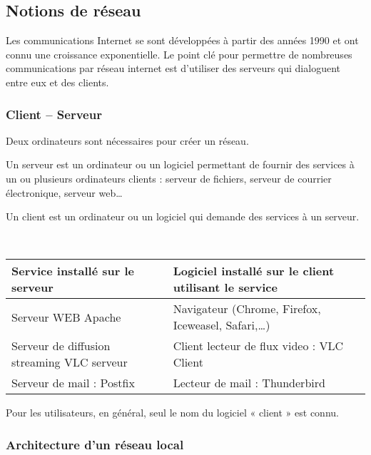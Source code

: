 \subsection{Notions de réseau}
Les communications Internet se sont développées à partir des années 1990 et ont connu une croissance exponentielle. Le point clé pour permettre de nombreuses communications par réseau internet est d’utiliser des serveurs qui dialoguent entre eux et des clients.
\subsubsection{Client -- Serveur}
Deux ordinateurs sont nécessaires pour créer un réseau.
\begin{defi}[Serveur]
Un serveur est un ordinateur ou un logiciel permettant de fournir des services à un ou plusieurs ordinateurs clients : serveur de fichiers, serveur de courrier électronique, serveur web…
\end{defi}

\begin{defi}[Client]
Un client est un ordinateur ou un logiciel qui demande des services à un serveur. 
\end{defi}

\begin{exemple}~\\


\begin{center}
\begin{tabular}{|l|l|}
\hline
Service installé sur le serveur	& Logiciel installé sur le client utilisant le service \\ \hline
Serveur WEB Apache	&Navigateur (Chrome, Firefox, Iceweasel, Safari,…) \\ \hline
Serveur de diffusion streaming VLC serveur	& Client lecteur de flux video : VLC Client\\ \hline
Serveur de mail : Postfix	&Lecteur de mail : Thunderbird\\ \hline
\end{tabular}
\end{center}
\end{exemple}

Pour les utilisateurs, en général, seul le nom du logiciel « client » est connu.

\subsubsection{Architecture d’un réseau local}
 	 

